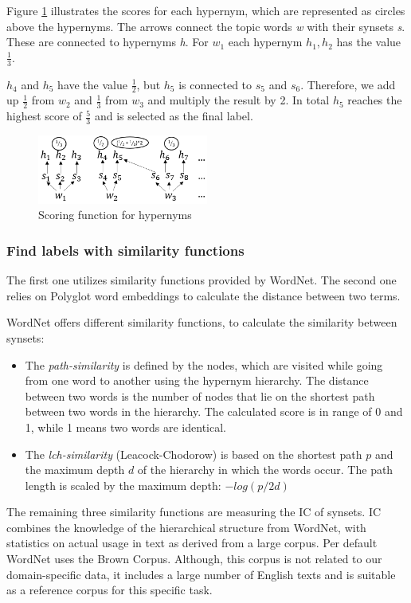 Figure \ref{pic:HypFun} illustrates the scores for each hypernym, which are represented as circles above the hypernyms. The arrows connect the topic words \textit{w} with their synsets \textit{s}. These are connected to hypernyms \textit{h}. For $w_{1}$ each hypernym $h_{1},h_{2}$ has the value $\tfrac{1}{3}$. {$h_{4}$ and $h_{5}$ have the value $\tfrac{1}{2}$, 
	but $h_{5}$ is connected to $s_{5}$ and $s_{6}$. Therefore, we add up $\tfrac{1}{2}$ from $w_{2}$ and $\tfrac{1}{3}$ from $w_{3}$ and multiply the result by 2. In total $h_{5}$ reaches the highest score of $\tfrac{5}{3}$ and is selected as the final label.

\begin{figure}
	\centering
	\includegraphics[width=0.5\textwidth]{gfx/Wordnet/HypFunF.png}
	\caption[\ac{ATL}: Scoring function for hypernyms]{Scoring function for hypernyms}
	\label{pic:HypFun}	
\end{figure}

\subsubsection{Find labels with similarity functions}
The first one utilizes similarity functions provided by WordNet. The second one relies on Polyglot word embeddings to calculate the distance between two terms.

WordNet offers different similarity functions, to calculate the similarity between synsets:
\begin{itemize}
\item The \textit{path-similarity} is defined by the nodes, which are visited while going from one word to another using the hypernym hierarchy. The distance between two words is the number of nodes that lie on the shortest path between two words in the hierarchy. The calculated score is in range of 0 and 1, while 1 means two words are identical.
\item The \textit{lch-similarity} (Leacock-Chodorow) is based on the shortest path $p$ and the maximum depth $d$ of the hierarchy in which the words occur. The path length is scaled by the maximum depth: $-log(p/2d)$\newline
\end{itemize}
The remaining three similarity functions are measuring the \ac{IC} of synsets. \ac{IC} combines the knowledge of the hierarchical structure from WordNet, with statistics on actual usage in text as derived from a large corpus. Per default WordNet uses the Brown Corpus. Although, this corpus is not related to our domain-specific data, it includes a large number of English texts and is suitable as a reference corpus for this specific task. 

}
